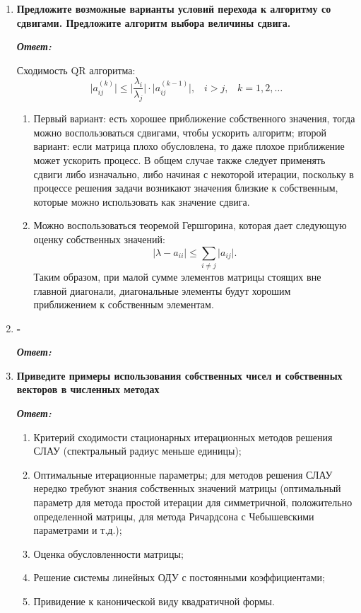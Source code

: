 \documentclass[12pt, a4paper]{article}
\newcommand{\abs}[1]{\lvert #1 \rvert}
\begin{document}
\begin{enumerate}
	\item \textbf{ Предложите возможные варианты условий перехода к алгоритму со сдвигами. Предложите алгоритм выбора величины сдвига.}
	\vspace*{0.2cm}
	
	\textit{\textbf{Ответ:}}
	
	Сходимость QR алгоритма:
	\[
	\abs{a_{ij}^{(k)}} \le \abs{\dfrac{\lambda_i}{\lambda_j}}\cdot \abs{a_{ij}^{(k-1)}}, \;\;\; i > j, \;\;\; k = 1, 2, \ldots
	\]
	\begin{enumerate}
		\item
		Первый вариант: есть хорошее приближение собственного значения, тогда можно воспользоваться сдвигами, чтобы ускорить алгоритм; второй вариант: если матрица плохо обусловлена, то даже плохое приближение может ускорить процесс. В общем случае также следует применять сдвиги либо изначально, либо начиная с некоторой итерации, поскольку в процессе решения задачи возникают значения близкие к собственным, которые можно использовать как значение сдвига.  
		
		\item Можно воспользоваться теоремой Гершгорина, которая дает следующую оценку собственных значений:
		\[
		\abs{\lambda - a_{ii}} \le \sum\limits_{i \neq j}\abs{a_{ij}}.
		\] 
		Таким образом, при малой сумме элементов матрицы стоящих вне главной диагонали, диагональные элементы будут хорошим приближением к собственным элементам.   
	\end{enumerate}
	
	
	\item \textbf{-}
	\vspace*{0.2cm}
	
	\textit{\textbf{Ответ:}}
	
	\item \textbf{Приведите примеры использования собственных чисел и собственных векторов в численных методах}
	\vspace*{0.2cm}
	
	\textit{\textbf{Ответ:}}
	\begin{enumerate}
		\item Критерий сходимости стационарных итерационных методов решения СЛАУ (спектральный радиус меньше единицы); 
		\item Оптимальные итерационные параметры; для методов решения СЛАУ нередко требуют знания собственных значений матрицы (оптимальный параметр для метода простой итерации для симметричной, положительно определенной матрицы, для метода Ричардсона с Чебышевскими параметрами и т.д.);
		\item Оценка обусловленности матрицы;
		\item Решение системы линейных ОДУ с постоянными коэффициентами; 
		\item Привидение к канонической виду квадратичной формы. 
	\end{enumerate}
	
	\end{enumerate}
\end{document}
